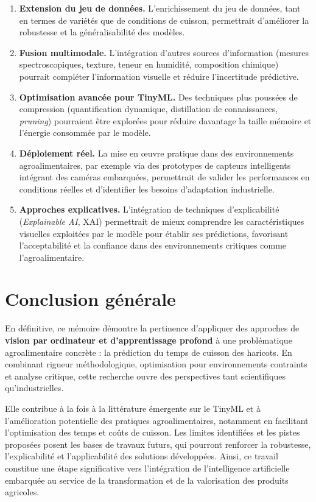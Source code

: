 \begin{enumerate}
    \item \textbf{Extension du jeu de données.} L'enrichissement du jeu de données, tant en termes de variétés que de conditions de cuisson, permettrait d'améliorer la robustesse et la généralisabilité des modèles.
    \item \textbf{Fusion multimodale.} L'intégration d'autres sources d'information (mesures spectroscopiques, texture, teneur en humidité, composition chimique) pourrait compléter l'information visuelle et réduire l'incertitude prédictive.
    \item \textbf{Optimisation avancée pour TinyML.} Des techniques plus poussées de compression (quantification dynamique, distillation de connaissances, \textit{pruning}) pourraient être explorées pour réduire davantage la taille mémoire et l'énergie consommée par le modèle.
    \item \textbf{Déploiement réel.} La mise en œuvre pratique dans des environnements agroalimentaires, par exemple via des prototypes de capteurs intelligents intégrant des caméras embarquées, permettrait de valider les performances en conditions réelles et d'identifier les besoins d'adaptation industrielle.
    \item \textbf{Approches explicatives.} L'intégration de techniques d'explicabilité (\textit{Explainable AI}, XAI) permettrait de mieux comprendre les caractéristiques visuelles exploitées par le modèle pour établir ses prédictions, favorisant l'acceptabilité et la confiance dans des environnements critiques comme l'agroalimentaire.
\end{enumerate}

\section{Conclusion générale}
\label{sec:conclusion_generale}

En définitive, ce mémoire démontre la pertinence d'appliquer des approches de \textbf{vision par ordinateur et d'apprentissage profond} à une problématique agroalimentaire concrète : la prédiction du temps de cuisson des haricots. En combinant rigueur méthodologique, optimisation pour environnements contraints et analyse critique, cette recherche ouvre des perspectives tant scientifiques qu'industrielles.

Elle contribue à la fois à la littérature émergente sur le TinyML et à l'amélioration potentielle des pratiques agroalimentaires, notamment en facilitant l'optimisation des temps et coûts de cuisson. Les limites identifiées et les pistes proposées posent les bases de travaux futurs, qui pourront renforcer la robustesse, l'explicabilité et l'applicabilité des solutions développées. Ainsi, ce travail constitue une étape significative vers l'intégration de l'intelligence artificielle embarquée au service de la transformation et de la valorisation des produits agricoles.

